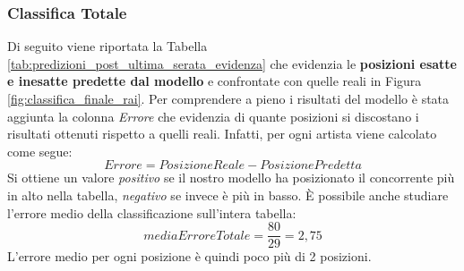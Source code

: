 \documentclass[a4paper,12pt]{article}
\begin{document}
\subsubsection{Classifica Totale}
Di seguito viene riportata la Tabella \ref{tab:predizioni_post_ultima_serata_evidenza} che evidenzia le \textbf{posizioni esatte e inesatte predette dal modello} e confrontate con quelle reali in Figura \ref{fig:classifica_finale_rai}. Per comprendere a pieno i risultati del modello è stata aggiunta la colonna \textit{Errore} che evidenzia di quante posizioni si discostano i risultati ottenuti rispetto a quelli reali. Infatti, per ogni artista viene calcolato come segue:
\[Errore=PosizioneReale-PosizionePredetta\]
Si ottiene un valore \textit{positivo} se il nostro modello ha posizionato il concorrente più in alto nella tabella, \textit{negativo} se invece è più in basso.
È possibile anche studiare l'errore medio della classificazione sull'intera tabella:
\[mediaErroreTotale=\frac{80}{29}=2,75\]
L'errore medio per ogni posizione è quindi poco più di 2 posizioni.
\end{document}
